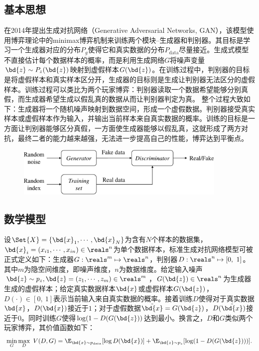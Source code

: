 

\subsection{基本思想}
\citet{goodfellow2014generative}在2014年提出生成对抗网络（Generative Adversarial Networks, GAN），该模型使用博弈理论中的minimax博弈机制来训练两个模块--生成器和判别器。其目标是学习一个生成器对应的分布$P_g$使得它和真实数据的分布$P_{\text{data}}$尽量接近。生成式模型不直接估计每个数据样本的概率，而是利用生成网络$G$将噪声变量$\bd{z} \sim P_z(\bd{z})$映射到虚假样本$G(\bd{z})$。在训练过程中，判别器的目标是将虚假样本和真实样本区分开，生成器的目标则是生成让判别器无法区分的虚假样本。训练过程可以类比为两个玩家博弈：判别器读取一个数据希望能够分别真假，而生成器希望生成以假乱真的数据从而让判别器判定为真。 整个过程大致如下：生成器将一个随机噪声映射到数据空间，形成一个虚假数据。判别器接受真实样本或虚假样本作为输入，并输出当前样本来自真实数据的概率。训练的目标是一方面让判别器能够区分真假，一方面使生成器能够以假乱真，这就形成了两方对抗，最终二者的能力越来越强，无法进一步提高自己的性能，博弈达到平衡点。
\begin{figure}[htbp]
  \centering
  \includegraphics[width=0.9\textwidth]{Img/arch-gan.pdf}
  \label{fig:arch-gan}
\end{figure}

\subsection{数学模型}
设$\Set{X} = \{\bd{x}_1, \cdots, \bd{x}_N\}$为含有$N$个样本的数据集，$\bd{x}_i = (x_{i1}, \cdots, x_{in}) \in \reals^n$为单个数据样本，标准生成对抗网络模型可被正式定义如下：生成器$G: \reals^m \mapsto \reals^n$，判别器$D: \reals^n \mapsto [0, ~1]$。其中$m$为隐空间维度，即噪声维度，$n$为数据维度。给定输入噪声$\bd{z} \sim p_z, \bd{z} = (z_1, \cdots, z_m) \in \reals^m$，$G(\bd{z}) \in \reals^n$为生成器生成的虚假样本；给定真实数据样本$\bd{x}$或虚假样本$G(\bd{z})$，$D(\cdot) \in [0,~1]$表示当前输入来自真实数据的概率。接着训练$D$使得对于真实数据$\bd{x}$，$D(\bd{x})$接近于$1$；对于虚假数据$\tilde{\bd{x}} = G(\bd{z})$，$D(\tilde{\bd{x}})$接近于$0$。同时训练$G$使得$\log(1 - D(G(\bd{z}))$达到最小。换言之，$D$和$G$类似两个玩家博弈，其价值函数如下：
\begin{equation}
  \min_G\max_D ~V(D,G) =
    \E_{\bd{x} \sim p_{\text{data}}}[\log D(\bd{x})] + 
    \E_{\bd{z} \sim p_z}[\log(1-D(G(\bd{z})))].
  \label{eq:gan-obj}
\end{equation}

